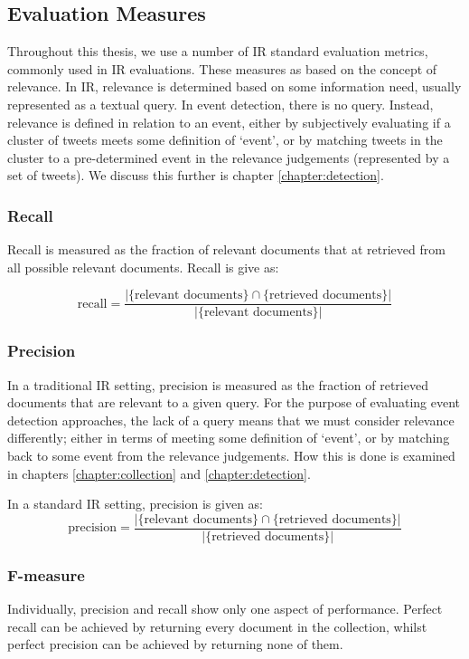 \subsection{Evaluation Measures}
Throughout this thesis, we use a number of IR standard evaluation metrics, commonly used in IR evaluations.
These measures as based on the concept of relevance.
In IR, relevance is determined based on some information need, usually represented as a textual query.
In event detection, there is no query.
Instead, relevance is defined in relation to an event, either by subjectively evaluating if a cluster of tweets meets some definition of `event', or by matching tweets in the cluster to a pre-determined event in the relevance judgements (represented by a set of tweets).
We discuss this further is chapter \ref{chapter:detection}.

\subsubsection{Recall}

Recall is measured as the fraction of relevant documents that at retrieved from all possible relevant documents. Recall is give as:

\begin{displaymath}
	\text{recall}=\frac{|\{\text{relevant documents}\}\cap\{\text{retrieved documents}\}|}{|\{\text{relevant documents}\}|}
\end{displaymath}

\subsubsection{Precision}
In a traditional IR setting, precision is measured as the fraction of retrieved documents that are relevant to a given query.
For the purpose of evaluating event detection approaches, the lack of a query means that we must consider relevance differently; either in terms of meeting some definition of `event', or by matching back to some event from the relevance judgements.
How this is done is examined in chapters \ref{chapter:collection} and \ref{chapter:detection}.

In a standard IR setting, precision is given as:
\begin{displaymath}
	\text{precision}=\frac{|\{\text{relevant documents}\}\cap\{\text{retrieved documents}\}|}{|\{\text{retrieved documents}\}|}
\end{displaymath}

\subsubsection{F-measure}
Individually, precision and recall show only one aspect of performance.
Perfect recall can be achieved by returning every document in the collection,
whilst perfect precision can be achieved by returning none of them.

